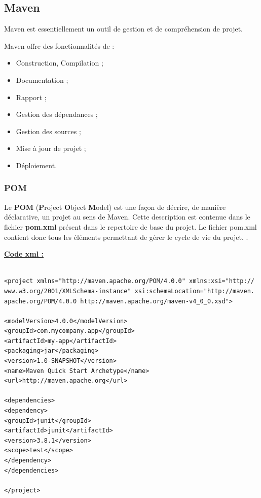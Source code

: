 \subsection{Maven} 
 


Maven est essentiellement un outil de gestion et de compréhension de projet. 

Maven offre des fonctionnalités de :
\begin{itemize}
\item  Construction,  Compilation ;
\item  Documentation ;
\item  Rapport ;
\item  Gestion des dépendances ;
\item  Gestion des sources ;
\item  Mise à jour de projet ;
\item  Déploiement.
\end{itemize}

\subsubsection{ POM  }
Le \textbf{POM} (\textbf{P}roject \textbf{O}bject \textbf{M}odel) est une façon de décrire, de manière déclarative, un projet au sens de Maven. Cette description est contenue dans le fichier \textbf{pom.xml} présent dans le repertoire de base du projet. Le fichier pom.xml contient donc tous les éléments permettant de gérer le cycle de vie du projet. \parencite{maven}.

\textbf{\underline{Code xml :}}	\\

 \lstset{language=XML}
\begin{lstlisting}

<project xmlns="http://maven.apache.org/POM/4.0.0" xmlns:xsi="http://
www.w3.org/2001/XMLSchema-instance" xsi:schemaLocation="http://maven.
apache.org/POM/4.0.0 http://maven.apache.org/maven-v4_0_0.xsd"> 

<modelVersion>4.0.0</modelVersion> 
<groupId>com.mycompany.app</groupId> 
<artifactId>my-app</artifactId> 
<packaging>jar</packaging> 
<version>1.0-SNAPSHOT</version> 
<name>Maven Quick Start Archetype</name> 
<url>http://maven.apache.org</url> 

<dependencies> 
<dependency> 
<groupId>junit</groupId> 
<artifactId>junit</artifactId> 
<version>3.8.1</version> 
<scope>test</scope> 
</dependency> 
</dependencies> 

</project>

\end{lstlisting}

